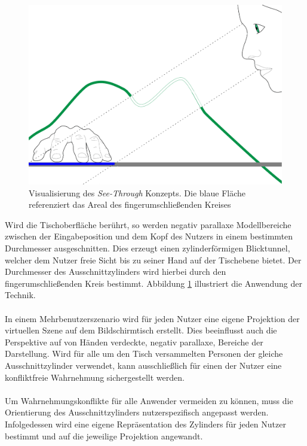\begin{figure}
	\begin{center}
		\includegraphics[width=12cm]{img/see_through_1.pdf}
	\end{center}
	\caption{Visualisierung des \emph{See-Through} Konzepts. Die blaue Fläche referenziert das Areal des fingerumschließenden Kreises}
	\label{fig:see_through_1}
\end{figure} 

Wird die Tischoberfläche berührt, so werden negativ parallaxe Modellbereiche zwischen der Eingabeposition und dem Kopf des Nutzers in einem bestimmten Durchmesser ausgeschnitten. Dies erzeugt einen zylinderförmigen Blicktunnel, welcher dem Nutzer freie Sicht bis zu seiner Hand auf der Tischebene bietet. Der Durchmesser des Ausschnittzylinders wird hierbei durch den fingerumschließenden Kreis bestimmt. Abbildung \ref{fig:see_through_1} illustriert die Anwendung der Technik.
\\\\
In einem Mehrbenutzerszenario wird für jeden Nutzer eine eigene Projektion der virtuellen Szene auf dem Bildschirmtisch erstellt. Dies beeinflusst auch die Perspektive auf von Händen verdeckte, negativ parallaxe, Bereiche der Darstellung. Wird für alle um den Tisch versammelten Personen der gleiche Ausschnittzylinder verwendet, kann ausschließlich für einen der Nutzer eine konfliktfreie Wahrnehmung sichergestellt werden.
\\\\
Um Wahrnehmungskonflikte für alle Anwender vermeiden zu können, muss die Orientierung des Ausschnittzylinders nutzerspezifisch angepasst werden. Infolgedessen wird eine eigene Repräsentation des Zylinders für jeden Nutzer bestimmt und auf die jeweilige Projektion angewandt.


